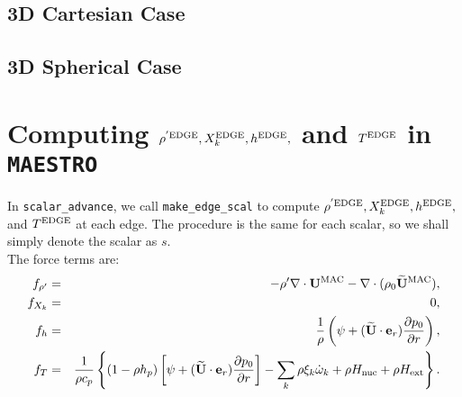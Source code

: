 \documentclass[11pt]{article}
\def\edge  {\rm EDGE}
\def\mac   {\rm MAC}
\def\eb    {{\bf e}}
\def\Ub    {{\bf U}}
\def\Ubt   {\widetilde{\bf U}}
\begin{document}
\subsection{3D Cartesian Case}
\subsection{3D Spherical Case}
\cleardoublepage
\section{Computing $\rho^{'\edge}, X_k^{\edge}, h^{\edge},$ and $T^{\edge}$ in {\tt MAESTRO}}
In {\tt scalar\_advance}, we call {\tt make\_edge\_scal} to compute $\rho^{'\edge}, X_k^{\edge}, h^{\edge},$ and $T^{\edge}$ at each edge.  The procedure is the same for each scalar, so we shall simply denote the scalar as $s$. \\

The force terms are:
\begin{eqnarray}
f_{\rho'} &=& -\rho'\nabla\cdot\Ub^{\mac} - \nabla\cdot(\rho_0\Ubt^{\mac}), \\
f_{X_k} &=& 0, \\
f_h &=& \frac{1}{\rho}\left(\psi + (\Ubt\cdot\eb_r)\frac{\partial p_0}{\partial r} \right), \\
f_T &=& \frac{1}{\rho c_p}\left\{(1-\rho h_p)\left[\psi + (\Ubt\cdot\eb_r)\frac{\partial p_0}{\partial r}\right] - \sum_k\rho\xi_k\dot\omega_k + \rho H_{\rm nuc} + \rho H_{\rm ext}\right\}.
\end{eqnarray}
\end{document}

